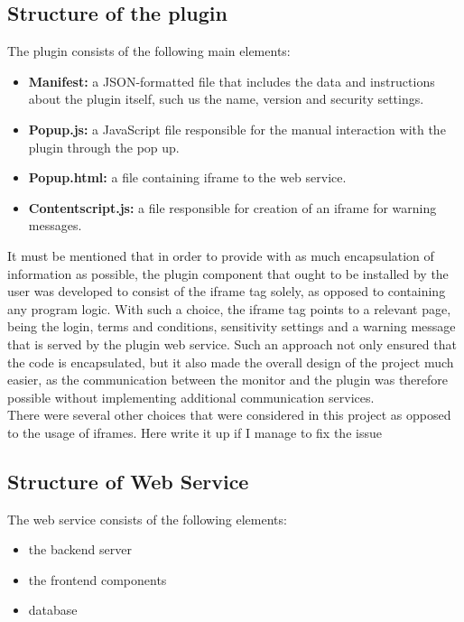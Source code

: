 \documentclass[a4paper,11pt]{article}
\begin{document}
\subsection{Structure of the plugin}
The plugin consists of the following main elements:

\begin{itemize}

\item \textbf{Manifest:} a JSON-formatted file that includes the data and instructions about the plugin itself, such us the name, version and security settings.

\item \textbf{Popup.js:} a JavaScript file responsible for the manual interaction with the plugin through the pop up.

\item \textbf{Popup.html:} a file containing iframe to the web service.

\item \textbf{Contentscript.js:} a file responsible for creation of an iframe for warning messages.

\end{itemize}

It must be mentioned that in order to provide with as much encapsulation of information as possible, the plugin component that ought to be installed by the user was developed to consist of the iframe tag solely, as opposed to containing any program logic. With such a choice, the iframe tag points to a relevant page, being the login, terms and conditions, sensitivity settings and a warning message that is served by the plugin web service. Such an approach not only ensured that the code is encapsulated, but it also made the overall design of the project much easier, as the communication between the monitor and the plugin was therefore possible without implementing additional communication services. \\
\indent There were several other choices that were considered in this project as opposed to the usage of iframes. Here write it up if I manage to fix the issue  

\subsection{Structure of Web Service}

The web service consists of the following elements:

\begin{itemize}

\item the backend server

\item the frontend components

\item database

\end{itemize}
\end{document}
